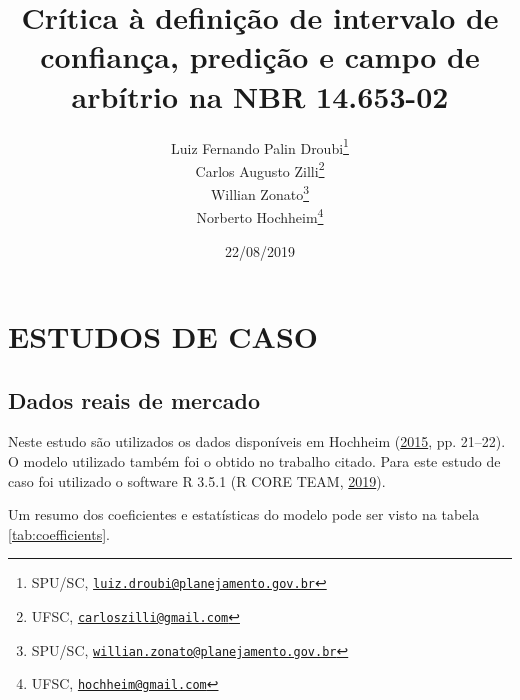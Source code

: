 \documentclass[a4paper, 12pt]{article}
\title{Crítica à definição de intervalo de confiança, predição e campo de
arbítrio na NBR 14.653-02}
\author{Luiz Fernando Palin Droubi\footnote{SPU/SC,
  \href{mailto:luiz.droubi@planejamento.gov.br}{\nolinkurl{luiz.droubi@planejamento.gov.br}}} \\ Carlos Augusto Zilli\footnote{UFSC,
  \href{mailto:carloszilli@gmail.com}{\nolinkurl{carloszilli@gmail.com}}} \\ Willian Zonato\footnote{SPU/SC,
  \href{mailto:willian.zonato@planejamento.gov.br}{\nolinkurl{willian.zonato@planejamento.gov.br}}} \\ Norberto Hochheim\footnote{UFSC,
  \href{mailto:hochheim@gmail.com}{\nolinkurl{hochheim@gmail.com}}}}
\date{22/08/2019}
\begin{document}
\maketitle

\hypertarget{estudos-de-caso}{%
\section{ESTUDOS DE CASO}\label{estudos-de-caso}}

\hypertarget{dados-reais-de-mercado}{%
\subsection{Dados reais de mercado}\label{dados-reais-de-mercado}}

Neste estudo são utilizados os dados disponíveis em Hochheim
(\protect\hyperlink{ref-hochheim}{2015}, pp. 21--22). O modelo utilizado
também foi o obtido no trabalho citado. Para este estudo de caso foi
utilizado o software R 3.5.1 (R CORE TEAM,
\protect\hyperlink{ref-R}{2019}).

\begin{table}[t]

\caption{\label{tab:coefficients}Coeficientes e estatísticas do modelo adotado.}
\centering
{}
\end{table}

Um resumo dos coeficientes e estatísticas do modelo pode ser visto na
tabela \ref{tab:coefficients}.
\end{document}
